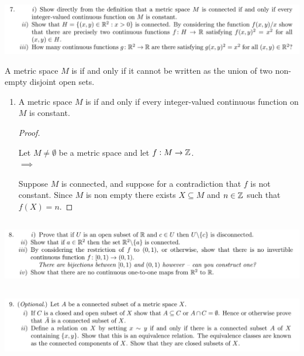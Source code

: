 \documentclass[12pt]{article}
\begin{document}
\subsection{}


\begin{mdframed}
\includegraphics[width=400pt]{img/oxford-a2-2-7.png}
\end{mdframed}

\begin{definition*}
  A metric space $M$ is  if and only if it cannot be written as the union of two
  non-empty disjoint open sets.
\end{definition*}

\begin{enumerate}[label=(\roman*)]
\item
  \begin{claim*}
    A metric space $M$ is  if and only if every integer-valued continuous function
    on $M$ is constant.
  \end{claim*}
  \begin{proof}~\\


    Let $M \neq \emptyset$ be a metric space and let $f:M \to \mathbb{Z}$.\\

    $\implies$

    Suppose $M$ is connected, and suppose for a contradiction that $f$ is not constant. Since $M$
    is non empty there exists $X \subseteq M$ and $n \in \mathbb{Z}$ such that $f(X) = n$.

  \end{proof}
\end{enumerate}

\subsection{}
\begin{mdframed}
\includegraphics[width=400pt]{img/oxford-a2-2-8.png}
\end{mdframed}

\subsection{}
\begin{mdframed}
\includegraphics[width=400pt]{img/oxford-a2-2-9.png}
\end{mdframed}
\end{document}
